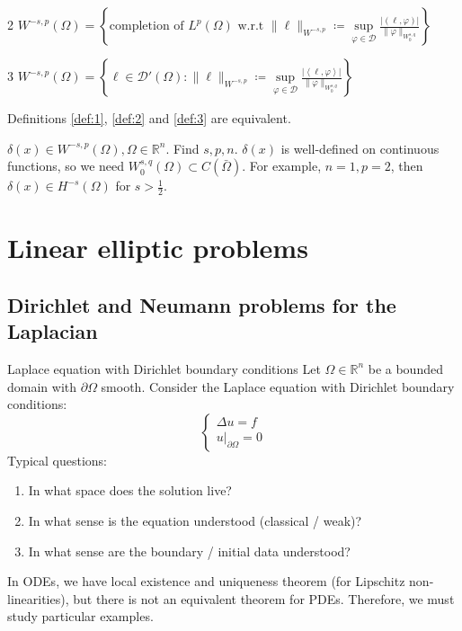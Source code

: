 \documentclass{report}
\begin{document}
\begin{definition}{}{2}
    \(W^{-s, p}(\Omega) = \left\{\text{completion of } L^{p}(\Omega) \text{ w.r.t } \|\ell\|_{W^{-s, p}} \coloneqq \sup\limits_{\varphi \in \mathcal{D}} \frac{\vert (\ell, \varphi) \vert }{\|\varphi\|_{W^{s, q}_{0}}} \right\} \) 
\end{definition}

\begin{definition}{}{3}
    \(W^{-s, p}(\Omega) = \left\{\ell \in \mathcal{D}'(\Omega) : \|\ell\|_{W^{-s, p}} \coloneqq \sup\limits_{\varphi \in \mathcal{D}} \frac{\vert\left\langle \ell, \varphi \right\rangle\vert}{\|\varphi\|_{W^{s, q}_{0}}} \right\} \)
\end{definition}

\mprop{}
{
    Definitions \ref{def:1}, \ref{def:2} and \ref{def:3} are equivalent.
}

\begin{example}{}{}
    \(\delta(x) \in W^{-s, p}(\Omega), \Omega \in \mathbb{R}^{n}\). Find \(s, p, n\). \(\delta(x)\) is well-defined on continuous functions, so we need \(W^{s, q}_{0}(\Omega) \subset C(\bar{\Omega})\). For example, \(n=1, p=2\), then \(\delta(x) \in H^{-s}(\Omega)\) for \(s>\frac{1}{2}\).
\end{example}

\chapter{Linear elliptic problems}
\section{Dirichlet and Neumann problems for the Laplacian}

\begin{example}{Laplace equation with Dirichlet boundary conditions}{}
    Let \(\Omega \in \mathbb{R}^{n}\) be a bounded domain with \(\partial \Omega\) smooth. Consider the Laplace equation with Dirichlet boundary conditions:
    \begin{equation}\label{eq:3.1}
        \begin{cases}
            \Delta u = f \\
            \left. u \right|_{\partial \Omega} = 0
        \end{cases}
    \end{equation}
    Typical questions: 
    \begin{enumerate}
        \item In what space does the solution live?
        \item In what sense is the equation understood (classical / weak)?
        \item In what sense are the boundary / initial data understood?
    \end{enumerate}
    In ODEs, we have local existence and uniqueness theorem (for Lipschitz non-linearities), but there is not an equivalent theorem for PDEs. Therefore, we must study particular examples.
\end{example}
\end{document}
